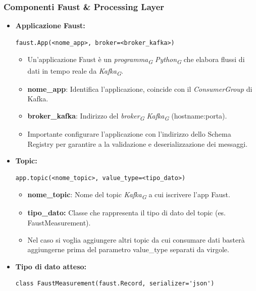 \subsubsection{Componenti Faust \& Processing Layer}
\begin{itemize}
    \item \textbf{Applicazione Faust:}
    \begin{lstlisting}[style=code]
        faust.App(<nome_app>, broker=<broker_kafka>)
    \end{lstlisting} 
    \begin{itemize}
        \item Un'applicazione Faust è un \textit{programma}\textsubscript{\textit{G}} \textit{Python}\textsubscript{\textit{G}} che elabora flussi di dati in tempo reale da \textit{Kafka}\textsubscript{\textit{G}}.
        \item \textbf{nome\_app}: Identifica l'applicazione, coincide con il \textit{ConsumerGroup} di Kafka.
        \item \textbf{broker\_kafka}: Indirizzo del \textit{broker}\textsubscript{\textit{G}} \textit{Kafka}\textsubscript{\textit{G}} (hostname:porta).
        \item Importante configurare l'applicazione con l'indirizzo dello Schema Registry per garantire a la validazione e deserializzazione dei messaggi.
    \end{itemize}
    \item \textbf{Topic:}
    \begin{lstlisting}[style=code]
        app.topic(<nome_topic>, value_type=<tipo_dato>)
    \end{lstlisting}  
    \begin{itemize}
        \item \textbf{nome\_topic}: Nome del topic \textit{Kafka}\textsubscript{\textit{G}} a cui iscrivere l'app Faust.
        \item \textbf{tipo\_dato:} Classe che rappresenta il tipo di dato del topic (es. FaustMeasurement).
        \item Nel caso si voglia aggiungere altri topic da cui consumare dati basterà aggiungerne prima del parametro value\_type separati da virgole.
    \end{itemize}
    \item \textbf{Tipo di dato atteso:}
     \begin{lstlisting}[style=code]
        class FaustMeasurement(faust.Record, serializer='json')
    \end{lstlisting}  

\end{itemize}
